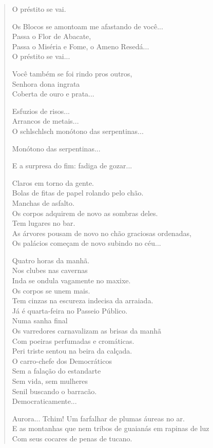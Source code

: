 \begin{verse}
O préstito se vai.

Os Blocos se amontoam me afastando de você...\\
Passa o Flor de Abacate,\\
Passa o Miséria e Fome, o Ameno Resedá...\\
O préstito se vai...

Você também se foi rindo pros outros,\\
Senhora dona ingrata\\
Coberta de ouro e prata...

Esfuzios de risos...\\
\quad\quad\quad{}Arrancos de metais...\\
O schlschlsch monótono das serpentinas...

Monótono das serpentinas...

E a surpresa do fim: fadiga de gozar...

Claros em torno da gente.\\
Bolas de fitas de papel rolando pelo chão.\\
Manchas de asfalto.\\
Os corpos adquirem de novo as sombras deles.\\
Tem lugares no bar.\\
As árvores pousam de novo no chão graciosas ordenadas,\\
Os palácios começam de novo subindo no céu...

Quatro horas da manhã.\\
Nos clubes nas cavernas\\
Inda se ondula vagamente no maxixe.\\
Os corpos se unem mais.\\
Tem cinzas na escureza indecisa da arraiada.\\
Já é quarta-feira no Passeio Público.\\
Numa sanha final\\
Os varredores carnavalizam as brisas da manhã\\
Com poeiras perfumadas e cromáticas.\\
Peri triste sentou na beira da calçada.\\
O carro-chefe dos Democráticos\\
Sem a falação do estandarte\\
Sem vida, sem mulheres\\
Senil buscando o barracão.\\
Democraticamente...

Aurora... Tchim! Um farfalhar de plumas áureas no ar.\\
E as montanhas que nem tribos de guaianás em rapinas de luz\\
Com seus cocares de penas de tucano.


\end{verse}
